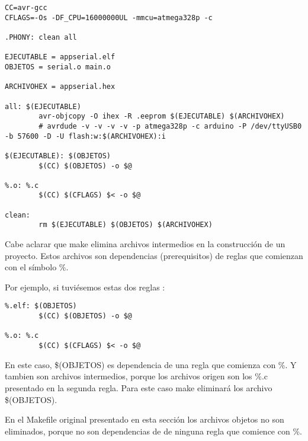 \documentclass[12pt]{article}
\begin{document}
\begin{verbatim}
CC=avr-gcc
CFLAGS=-Os -DF_CPU=16000000UL -mmcu=atmega328p -c

.PHONY: clean all

EJECUTABLE = appserial.elf
OBJETOS = serial.o main.o

ARCHIVOHEX = appserial.hex

all: $(EJECUTABLE)
        avr-objcopy -O ihex -R .eeprom $(EJECUTABLE) $(ARCHIVOHEX)
        # avrdude -v -v -v -v -p atmega328p -c arduino -P /dev/ttyUSB0 -b 57600 -D -U flash:w:$(ARCHIVOHEX):i

$(EJECUTABLE): $(OBJETOS)
        $(CC) $(OBJETOS) -o $@

%.o: %.c
        $(CC) $(CFLAGS) $< -o $@
	
clean:
        rm $(EJECUTABLE) $(OBJETOS) $(ARCHIVOHEX)
\end{verbatim}


Cabe aclarar que make elimina archivos intermedios en la construcción
de un proyecto. Estos archivos son dependencias (prerequisitos) de reglas que comienzan 
con el símbolo \%.

Por ejemplo, si tuviésemos estas dos reglas :

\begin{verbatim}
%.elf: $(OBJETOS)
        $(CC) $(OBJETOS) -o $@

%.o: %.c
        $(CC) $(CFLAGS) $< -o $@
\end{verbatim}

En este caso, \$(OBJETOS) es dependencia de una regla que comienza con \%.
Y tambien son archivos intermedios, porque los archivos origen son los 
\%.c presentado en la segunda regla. Para este caso make eliminará
los archivo \$(OBJETOS).

En el Makefile original presentado en esta sección los archivos objetos
no son eliminados, porque no son dependencias de de ninguna regla que comience con \%.
\end{document}
